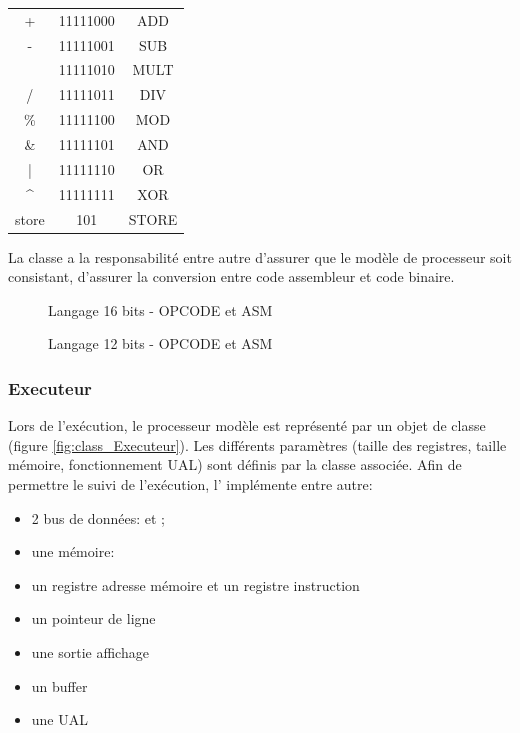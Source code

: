 \begin{minipage}[t]{0.48\textwidth}
\begin{minipage}[t]{0.5\textwidth}
\begin{tabular}{>{\ttfamily\footnotesize}c|>{\ttfamily\footnotesize}c|>{\ttfamily\footnotesize}c}
			+                  & 11111000 & ADD   \\
			-                  & 11111001 & SUB   \\
			*                  & 11111010 & MULT  \\
			/                  & 11111011 & DIV   \\
			\%                 & 11111100 & MOD   \\
			\&                 & 11111101 & AND   \\
			|                  & 11111110 & OR    \\
			\textasciicircum{} & 11111111 & XOR   \\
			store              & 101      & STORE
		\end{tabular}
	\end{minipage}
\end{minipage}

La classe  a la responsabilité entre autre d'assurer que le modèle de processeur soit consistant, d'assurer la conversion entre code assembleur et code binaire.
\begin{figure}
	\centering
		
		\caption{Langage 16 bits - OPCODE et ASM}
\end{figure}

\begin{figure}
	\centering
	
	\caption{Langage 12 bits - OPCODE et ASM}
\end{figure}

\clearpage
\subsubsection{Executeur}

Lors de l'exécution, le processeur modèle est représenté par un objet de classe  (figure \ref{fig:class_Executeur}). Les différents paramètres (taille des registres, taille mémoire, fonctionnement UAL) sont définis par la classe  associée. Afin de permettre le suivi de l'exécution, l' implémente entre autre:
\begin{itemize}
	\item 2 bus de données:  et ;
	\item une mémoire: 
	\item un registre adresse mémoire  et un registre instruction 
	\item un pointeur de ligne 
	\item une sortie affichage 
	\item un buffer 
	\item une UAL 
\end{itemize}



